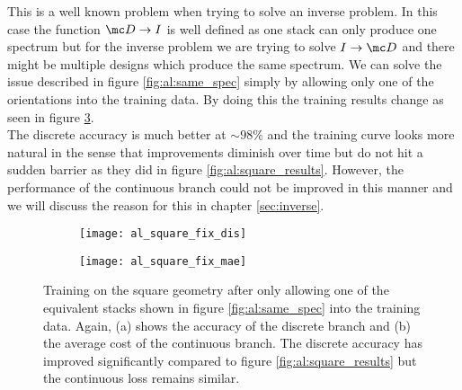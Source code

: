 \newpage
This is a well known problem when trying to solve an inverse problem. In this case the function $\mc D \rightarrow I$ is well defined as one stack can only produce one spectrum but for the inverse problem we are trying to solve $I \rightarrow \mc D$ and there might be multiple designs which produce the same spectrum. We can solve the issue described in figure \ref{fig:al:same_spec} simply by allowing only one of the orientations into the training data. By doing this the training  results change as seen in figure \ref{fig:al:squares_fix}.
\\

\indent
The discrete accuracy is much better at $\sim 98 \%$ and the training curve looks more natural in the sense that improvements diminish over time but do not hit a sudden barrier as they did in figure \ref{fig:al:square_results}. However, the performance of the continuous branch could not be improved in this manner and we will discuss the reason for this in chapter \ref{sec:inverse}.

\begin{figure}[H]
\centering
\begin{subfigure}{.5\textwidth}
    \centering
    \texttt{[image: al\_square\_fix\_dis]}
    \caption{}
    \label{}
\end{subfigure}%
\begin{subfigure}{.5\textwidth}
    \centering
    \texttt{[image: al\_square\_fix\_mae]}
    \caption{}
    \label{}
\end{subfigure}
\caption{Training on the square geometry after only allowing one of the equivalent stacks shown in figure \ref{fig:al:same_spec} into the training data.
Again, (a) shows the accuracy of the discrete branch and (b) the average cost of the continuous branch. The discrete accuracy has improved significantly compared to figure \ref{fig:al:square_results} but the continuous loss remains similar.}
\label{fig:al:squares_fix}
\end{figure}

